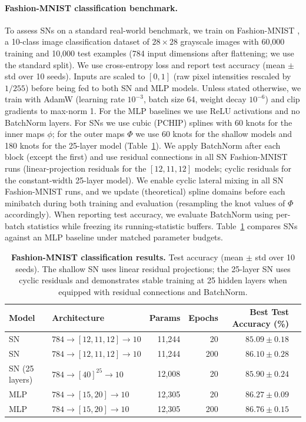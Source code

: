 \documentclass{article}
\theoremstyle{plain}
\theoremstyle{definition}
\theoremstyle{remark}
\begin{document}
\paragraph{Fashion-MNIST classification benchmark.}
To assess SNs on a standard real-world benchmark, we train on Fashion-MNIST \cite{xiao2017fashionmnist}, a 10-class image classification dataset of $28\times28$ grayscale images with 60,000 training and 10,000 test examples (784 input dimensions after flattening; we use the standard split). We use cross-entropy loss and report test accuracy (mean $\pm$ std over 10 seeds). Inputs are scaled to $[0,1]$ (raw pixel intensities rescaled by $1/255$) before being fed to both SN and MLP models. Unless stated otherwise, we train with AdamW (learning rate $10^{-3}$, batch size 64, weight decay $10^{-6}$) and clip gradients to max-norm 1. For the MLP baselines we use ReLU activations and no BatchNorm layers. For SNs we use cubic (\textsc{PCHIP}) splines with 60 knots for the inner maps $\phi$; for the outer maps $\Phi$ we use 60 knots for the shallow models and 180 knots for the 25-layer model (Table~\ref{tab:fashion-mnist}). We apply BatchNorm after each block (except the first) and use residual connections in all SN Fashion-MNIST runs (linear-projection residuals for the $[12,11,12]$ models; cyclic residuals for the constant-width 25-layer model). We enable cyclic lateral mixing in all SN Fashion-MNIST runs, and we update (theoretical) spline domains before each minibatch during both training and evaluation (resampling the knot values of $\Phi$ accordingly). When reporting test accuracy, we evaluate BatchNorm using per-batch statistics while freezing its running-statistic buffers. Table~\ref{tab:fashion-mnist} compares SNs against an MLP baseline under matched parameter budgets.

\begin{table}[ht]
\centering
\caption{\textbf{Fashion-MNIST classification results.} Test accuracy (mean $\pm$ std over 10 seeds). The shallow SN uses linear residual projections; the 25-layer SN uses cyclic residuals and demonstrates stable training at 25 hidden layers when equipped with residual connections and BatchNorm.}
\label{tab:fashion-mnist}
\small
\begin{tabular}{llrrrr}
\toprule
Model & Architecture & Params & Epochs & Best Test Accuracy (\%) \\
\midrule
SN & $784\to[12,11,12]\to10$ & 11{,}244 & 20 & $85.09 \pm 0.18$ \\
SN & $784\to[12,11,12]\to10$ & 11{,}244 & 200 & $86.10 \pm 0.28$ \\
SN (25 layers) & $784\to[40]^{25}\to10$ & 12{,}008 & 20 & $85.90 \pm 0.24$ \\
\midrule
MLP & $784\to[15,20]\to10$ & 12{,}305 & 20 & $86.27 \pm 0.09$ \\
MLP & $784\to[15,20]\to10$ & 12{,}305 & 200 & $86.76 \pm 0.15$ \\
\bottomrule
\end{tabular}
\end{table}
\end{document}
